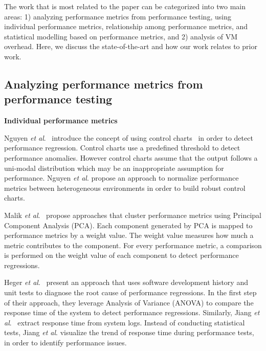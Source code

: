 The work that is most related to the paper can be categorized into two main areas: 1) analyzing performance metrics from performance testing, using individual performance metrics, relationship among performance metrics, and statistical modelling based on performance metrics, and 2) analysis of VM overhead. Here, we discuss the state-of-the-art and how our work relates to prior work.

\subsection{Analyzing performance metrics from performance testing} 

\noindent \textbf{Individual performance metrics}

Nguyen \textit{et al$.$}~\cite{Nguyen:2012:ADP:2188286.2188344} introduce the concept of using control charts~\cite{shewhart1931economic} in order to detect performance regression. Control charts use a predefined threshold to detect performance anomalies. However control charts assume that the output follows a uni-modal distribution which may be an inappropriate assumption for performance. Nguyen \textit{ et al$.$} propose an approach to normalize performance metrics between heterogeneous environments in order to build robust control charts. %

Malik \emph{et al$.$}~\cite{Malik:2010:ACL:1955601.1955936, haroon} propose approaches that cluster performance metrics using Principal Component Analysis (PCA). Each component generated by PCA is mapped to performance metrics by a weight value. The weight value measures how much a metric contributes to the component. For every performance metric, a comparison is performed on the weight value of each component to detect performance regressions.

Heger \emph{et al$.$}~\cite{DBLP:conf/wosp/HegerHF13} present an approach that uses software development history and unit tests to diagnose the root cause of performance regressions. In the first step of their approach, they leverage Analysis of Variance (ANOVA) to compare the response time of the system to detect performance regressions. Similarly, Jiang \emph{et al$.$}~\cite{jackicsm2009} extract response time from system logs. Instead of conducting statistical tests, Jiang \emph{et al$.$} visualize the trend of response time during performance tests, in order to identify performance issues.


